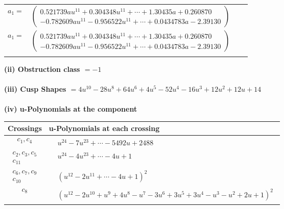 \documentclass[1p]{elsarticle_modified}
\theoremstyle{definition}
\begin{document}
\begin{tabular}{m{7pt} m{180pt} m{7pt} m{180pt} }
\flushright $a_{1}=$&$\begin{pmatrix}0.521739 a u^{11}+0.304348 u^{11}+\cdots+1.30435 a+0.260870\\-0.782609 a u^{11}-0.956522 u^{11}+\cdots+0.0434783 a-2.39130\end{pmatrix}$\\ \flushright $a_{1}=$&$\begin{pmatrix}0.521739 a u^{11}+0.304348 u^{11}+\cdots+1.30435 a+0.260870\\-0.782609 a u^{11}-0.956522 u^{11}+\cdots+0.0434783 a-2.39130\end{pmatrix}$\\&\end{tabular}
\flushleft \textbf{(ii) Obstruction class $= -1$}\\~\\
\flushleft \textbf{(iii) Cusp Shapes $= 4 u^{10}-28 u^8+64 u^6+4 u^5-52 u^4-16 u^3+12 u^2+12 u+14$}\\~\\
\newpage\renewcommand{\arraystretch}{1}
\flushleft \textbf{(iv) u-Polynomials at the component}\newline \\
\begin{tabular}{m{50pt}|m{274pt}}
Crossings & \hspace{64pt}u-Polynomials at each crossing \\
\hline $$\begin{aligned}c_{1},c_{4}\end{aligned}$$&$\begin{aligned}
&u^{24}-7 u^{23}+\cdots-5492 u+2488
\end{aligned}$\\
\hline $$\begin{aligned}c_{2},c_{3},c_{5}\\c_{11}\end{aligned}$$&$\begin{aligned}
&u^{24}-4 u^{23}+\cdots-4 u+1
\end{aligned}$\\
\hline $$\begin{aligned}c_{6},c_{7},c_{9}\\c_{10}\end{aligned}$$&$\begin{aligned}
&(u^{12}-2 u^{11}+\cdots-4 u+1)^{2}
\end{aligned}$\\
\hline $$\begin{aligned}c_{8}\end{aligned}$$&$\begin{aligned}
&(u^{12}-2 u^{10}+u^9+4 u^8- u^7-3 u^6+3 u^5+3 u^4- u^3- u^2+2 u+1)^2
\end{aligned}$\\
\hline
\end{tabular}\\~\\
\end{document}
